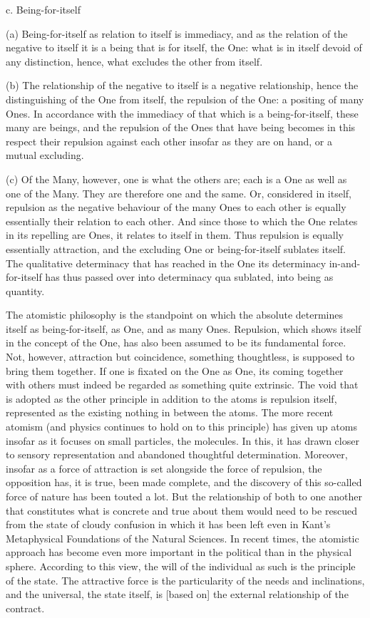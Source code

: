 c. Being-for-itself

(a) Being-for-itself as relation to itself is immediacy,
and as the relation of the negative to itself
it is a being that is for itself, the One:
what is in itself devoid of any distinction,
hence, what excludes the other from itself.

(b) The relationship of the negative to itself
is a negative relationship,
hence the distinguishing of the One from itself,
the repulsion of the One:
a positing of many Ones.
In accordance with the immediacy of
that which is a being-for-itself,
these many are beings,
and the repulsion of the Ones that have being
becomes in this respect their repulsion against each other
insofar as they are on hand, or a mutual excluding.

(c) Of the Many, however, one is what the others are;
each is a One as well as one of the Many.
They are therefore one and the same.
Or, considered in itself,
repulsion as the negative behaviour of
the many Ones to each other is
equally essentially their relation to each other.
And since those to which the One relates
in its repelling are Ones,
it relates to itself in them.
Thus repulsion is equally essentially attraction,
and the excluding One or being-for-itself sublates itself.
The qualitative determinacy that has reached in the One
its determinacy in-and-for-itself
has thus passed over into determinacy qua sublated,
into being as quantity.

    The atomistic philosophy is the standpoint on which
    the absolute determines itself as being-for-itself,
    as One, and as many Ones.
    Repulsion, which shows itself in the concept of the One,
    has also been assumed to be its fundamental force.
    Not, however, attraction but coincidence, something thoughtless, is
    supposed to bring them together.
    If one is fixated on the One as One,
    its coming together with others must indeed
    be regarded as something quite extrinsic.
    The void that is adopted as the other principle
    in addition to the atoms is repulsion itself,
    represented as the existing nothing in between the atoms.
    The more recent atomism
    (and physics continues to hold on to this principle)
    has given up atoms insofar as it focuses on
    small particles, the molecules.
    In this, it has drawn closer to sensory representation
    and abandoned thoughtful determination.
    Moreover, insofar as a force of attraction is set alongside
    the force of repulsion, the opposition has, it is true,
    been made complete, and the discovery of this so-called
    force of nature has been touted a lot.
    But the relationship of both to one another
    that constitutes what is concrete and true about them
    would need to be rescued from the state of cloudy confusion
    in which it has been left even in Kant's
    Metaphysical Foundations of the Natural Sciences.
    In recent times, the atomistic approach has become
    even more important in the political than in the physical sphere.
    According to this view, the will of the individual as such is
    the principle of the state.
    The attractive force is the particularity of the needs and inclinations,
    and the universal, the state itself, is [based on]
    the external relationship of the contract.
